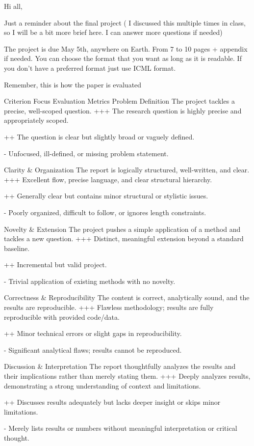 

 Hi all,

Just a reminder about the final project ( I discussed this multiple times in class, so I will be a bit more brief here.  I can answer more questions if needed)

The project is due May 5th, anywhere on Earth. From 7 to 10 pages + appendix if needed. You can choose the format that you want as long as it is readable. If you don't have a preferred format just use ICML format.

Remember, this is how the paper is evaluated 

Criterion	Focus	Evaluation Metrics
Problem Definition	The project tackles a precise, well-scoped question.	
+++ The research question is highly precise and appropriately scoped.


++ The question is clear but slightly broad or vaguely defined.


- Unfocused, ill-defined, or missing problem statement.

Clarity & Organization	The report is logically structured, well-written, and clear.	
+++ Excellent flow, precise language, and clear structural hierarchy.


++ Generally clear but contains minor structural or stylistic issues.


- Poorly organized, difficult to follow, or ignores length constraints.

Novelty & Extension	The project pushes a simple application of a method and tackles a new question.	
+++ Distinct, meaningful extension beyond a standard baseline.


++ Incremental but valid project.


- Trivial application of existing methods with no novelty.

Correctness & Reproducibility	The content is correct, analytically sound, and the results are reproducible.	
+++ Flawless methodology; results are fully reproducible with provided code/data.


++ Minor technical errors or slight gaps in reproducibility.


- Significant analytical flaws; results cannot be reproduced.

Discussion & Interpretation	The report thoughtfully analyzes the results and their implications rather than merely stating them.	
+++ Deeply analyzes results, demonstrating a strong understanding of context and limitations.


++ Discusses results adequately but lacks deeper insight or skips minor limitations.


- Merely lists results or numbers without meaningful interpretation or critical thought.



